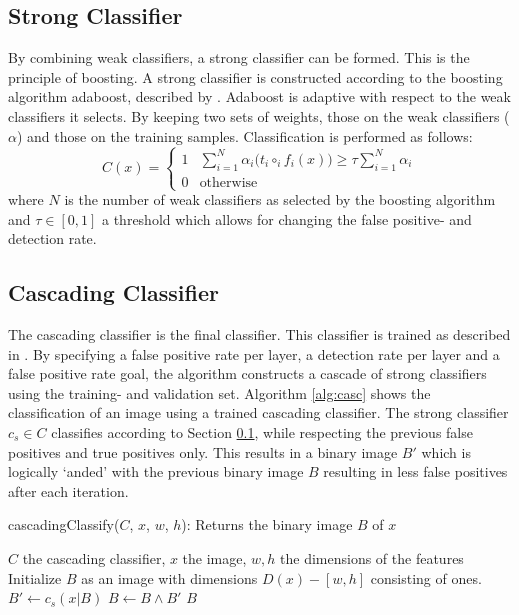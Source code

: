 \documentclass[a4paper,11pt]{article}
\begin{document}
\subsection{Strong Classifier} \label{sec:strong}
By combining weak classifiers, a strong classifier can be formed. This is the
principle of boosting.  A strong classifier is constructed according to the
boosting algorithm adaboost, described by \cite{viola}. Adaboost is adaptive
with respect to the weak classifiers it selects. By keeping two sets of
weights, those on the weak classifiers ($\alpha$) and those on the training
samples. Classification is performed as follows:
\begin{displaymath}
C(x) = 
	\left\{ \begin{array}{ll}
		1 & \sum^N_{i=1} \alpha_i \big(t_i \circ_i f_i(x)\big) \ge \tau \sum^N_{i=1}\alpha_i \\
		0 & \textrm{otherwise}
	\end{array} \right.
\end{displaymath}
where $N$ is the number of weak classifiers as selected by the boosting
algorithm and $\tau \in [0,1]$ a threshold which allows for changing the false
positive- and detection rate.

\subsection{Cascading Classifier} \label{sec:casc}
The cascading classifier is the final classifier. This classifier is trained as
described in \cite{viola}. By specifying a false positive rate per layer, a
detection rate per layer and a false positive rate goal, the algorithm
constructs a cascade of strong classifiers using the training- and validation
set.  Algorithm \ref{alg:casc} shows the classification of an image using a
trained cascading classifier. The strong classifier $c_s \in C$ classifies
according to Section \ref{sec:strong}, while respecting the previous false
positives and true positives only. This results in a binary image $B'$ which is
logically `anded' with the previous binary image $B$ resulting in less false
positives after each iteration.
\begin{algorithm}[!htb]
	\caption{cascadingClassify($C$, $x$, $w$, $h$): Returns the binary image $B$ of $x$}
	\begin{algorithmic}[1]
	\REQUIRE $C$ the cascading classifier, $x$ the image, $w,h$ the dimensions of the features
	\medskip
	\STATE Initialize $B$ as an image with dimensions $D(x) - [w,h]$ consisting of ones.
		\STATE $B' \leftarrow c_s(x|B)$
		\STATE $B \leftarrow B \land B'$
	\ENDFOR
	\RETURN $B$
	\end{algorithmic}
\label{alg:casc}
\end{algorithm}
\end{document}
